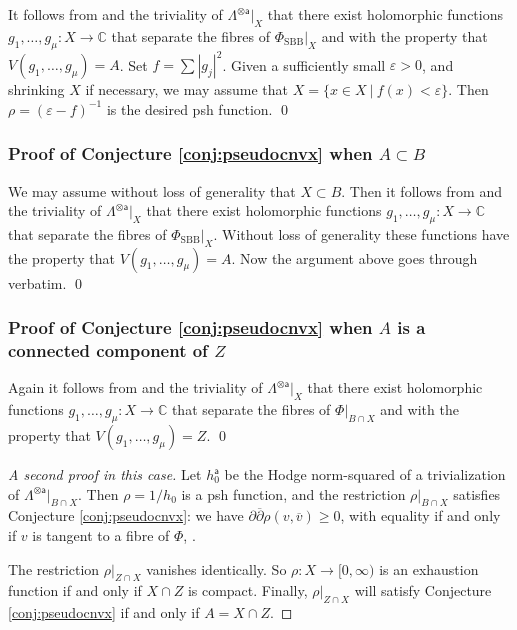 \documentclass[12pt]{amsart}
\numberwithin{equation}{section}
\numberwithin{table}{section}
\def\e{\varepsilon}
\def\sfa{\mathsf{a}}
\def\bC{\mathbb{C}}
\def\ot{\otimes}
\theoremstyle{definition}
\theoremstyle{definition}
\theoremstyle{remark}
\def\ddb{\partial\overline{\partial}}
\def\PhiS{\Phi_\mathrm{SBB}}
\begin{document}
It follows from \cite{MR0216035} and the triviality of $\Lambda^{\ot \sfa}\big|_X$ that there exist holomorphic functions $g_1 , \ldots, g_\mu : X \to \bC$ that separate the fibres of $\PhiS\big|_{X}$ and with the property that $V(g_1,\ldots,g_\mu) = A$.  Set $f = \sum |g_j|^2$.  Given a sufficiently small $\e>0$, and shrinking $X$ if necessary, we may assume that $X = \{ x \in X \ | \ f(x) < \e \}$.  Then $\rho = (\e - f)^{-1}$ is the desired psh function. 
\hfill\qed

\subsubsection{Proof of Conjecture \ref{conj:pseudocnvx} when $A \subset B$}

We may assume without loss of generality that $X \subset B$.  Then it follows from \cite[Theorem 6.14]{MR4557401} and the triviality of $\Lambda^{\ot \sfa}\big|_X$ that there exist holomorphic functions $g_1 , \ldots, g_\mu : X \to \bC$ that separate the fibres of $\PhiS\big|_{X}$.  Without loss of generality these functions have the property that $V(g_1,\ldots,g_\mu) = A$.  Now the argument above goes through verbatim.
\hfill\qed

\subsubsection{Proof of Conjecture \ref{conj:pseudocnvx} when $A$ is a connected component of $Z$} \label{S:pg}

Again it follows from \cite[Theorem 6.14]{MR4557401} and the triviality of $\Lambda^{\ot \sfa}\big|_X$ that there exist holomorphic functions $g_1 , \ldots, g_\mu : X \to \bC$ that separate the fibres of $\Phi\big|_{B\cap X}$ and with the property that $V(g_1,\ldots,g_\mu) = Z$.  \hfill\qed

\begin{proof}[A second proof in this case]
Let $h_0^\sfa$ be the Hodge norm-squared of a trivialization of $\Lambda^{\ot \sfa}\big|_{B\cap X}$.  Then $\rho = 1/h_0$ is a psh function, and the restriction $\rho \big|_{B \cap X}$ satisfies Conjecture \ref{conj:pseudocnvx}: we have $\ddb \rho( v , \overline v) \ge 0$, with equality if and only if $v$ is tangent to a fibre of $\Phi$, \cite{MR0259958}.  

The restriction $\rho\big|_{Z \cap X}$ vanishes identically.  So $\rho : X \to [0,\infty)$ is an exhaustion function if and only if $X \cap Z$ is compact.  Finally, $\rho\big|_{Z \cap X}$ will satisfy Conjecture \ref{conj:pseudocnvx} if and only if $A = X \cap Z$.
\end{proof}
\end{document}
